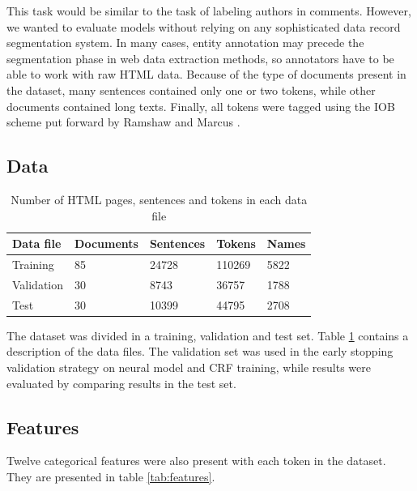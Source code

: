 \documentclass[sigconf]{acmart}
\begin{document}
This task would be similar to the task of labeling authors in comments.
However, we wanted to evaluate models without relying on any sophisticated data record
segmentation system. In many cases, entity annotation may precede the segmentation
phase in web data extraction methods, so annotators have to be able to work with
raw HTML data. Because of the type of documents present in the dataset, many sentences 
contained only one or two tokens, while other documents contained long texts.
Finally, all tokens were tagged using the IOB scheme put forward by
Ramshaw and Marcus \cite{Ramshaw1999}. 

\subsection{Data}

\begin{table}[h]
  \small
  \begin{center}
    \begin{tabular}{ lllll }
      \toprule
      Data file & Documents & Sentences & Tokens & Names \\
      \midrule
      Training    & 85 & 24728 & 110269 & 5822 \\  
      Validation  & 30 & 8743  & 36757  & 1788 \\
      Test        & 30 & 10399 & 44795  & 2708 \\
      \bottomrule
    \end{tabular}
  \end{center}
  \caption{Number of HTML pages, sentences and tokens in each data file}
  \label{tab:dataset}
\end{table}

The dataset was divided in a training, validation and test set. Table \ref{tab:dataset} contains
a description of the data files. The validation set was used in the early stopping validation strategy
on neural model and CRF training, while results were evaluated by comparing results in the test set.

\subsection{Features}

Twelve categorical features were also present with each token in the dataset. They 
are presented in table \ref{tab:features}.
\end{document}
